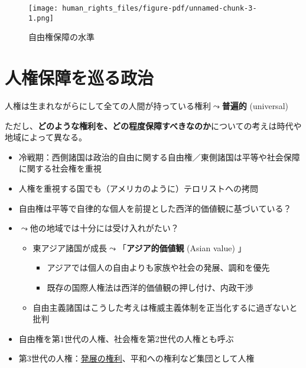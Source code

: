 \documentclass[
  xelatex,
  ja=standard]{bxjsarticle}
\providecommand{\tightlist}{%
  \setlength{\itemsep}{0pt}\setlength{\parskip}{0pt}}\usepackage{longtable,booktabs,array}
\begin{document}
\begin{figure}[htpb]

{\centering \texttt{[image: human\_rights\_files/figure-pdf/unnamed-chunk-3-1.png]}

}

\caption{自由権保障の水準}

\end{figure}

\hypertarget{ux4ebaux6a29ux4fddux969cux3092ux5de1ux308bux653fux6cbb}{%
\section{人権保障を巡る政治}\label{ux4ebaux6a29ux4fddux969cux3092ux5de1ux308bux653fux6cbb}}

人権は生まれながらにして全ての人間が持っている権利\(\leadsto\)\textbf{普遍的}
(universal)

ただし、\textbf{どのような権利を、どの程度保障すべきなのか}についての考えは時代や地域によって異なる。

\begin{itemize}
\tightlist
\item
  冷戦期：西側諸国は政治的自由に関する自由権／東側諸国は平等や社会保障に関する社会権を重視
\item
  人権を重視する国でも（アメリカのように）テロリストへの拷問
\item
  自由権は平等で自律的な個人を前提とした西洋的価値観に基づいている？
\item
  \(\leadsto\)他の地域では十分には受け入れがたい？

  \begin{itemize}
  \tightlist
  \item
    東アジア諸国が成長\(\leadsto\)「\textbf{アジア的価値観} (Asian
    value) 」

    \begin{itemize}
    \tightlist
    \item
      アジアでは個人の自由よりも家族や社会の発展、調和を優先
    \item
      既存の国際人権法は西洋的価値観の押し付け、内政干渉
    \end{itemize}
  \item
    自由主義諸国はこうした考えは権威主義体制を正当化するに過ぎないと批判
  \end{itemize}
\item
  自由権を第1世代の人権、社会権を第2世代の人権とも呼ぶ
\item
  第3世代の人権：\href{https://www.unic.or.jp/activities/humanrights/promotion_protection/development/}{発展の権利}、平和への権利など集団として人権
\end{itemize}
\end{document}
